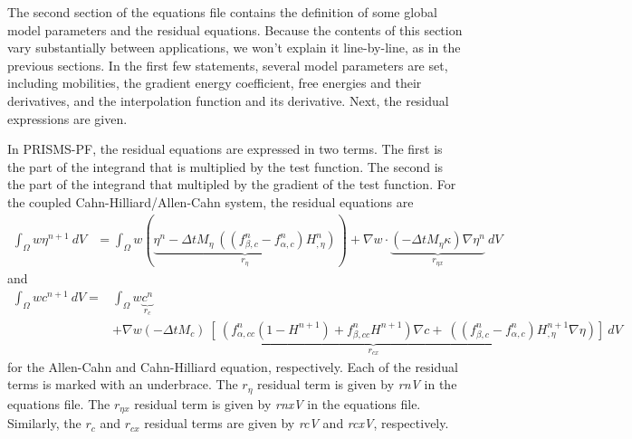 \documentclass[10pt]{article} %
\begin{document}
The second section of the equations file contains the definition of some global model parameters and the residual equations. Because the contents of this section vary substantially between applications, we won't explain it line-by-line, as in the previous sections. In the first few statements, several model parameters are set, including mobilities, the gradient energy coefficient, free energies and their derivatives, and the interpolation function and its derivative. Next, the residual expressions are given. 

In PRISMS-PF, the residual equations are expressed in two terms. The first is the part of the integrand that is multiplied by the test function. The second is the part of the integrand that multipled by the gradient of the test function. For the coupled Cahn-Hilliard/Allen-Cahn system, the residual equations are 
\begin{align}
  \int_{\Omega}   w  \eta^{n+1}  ~dV &=\int_{\Omega}  w  \left( \underbrace{\eta^{n} - \Delta t M_{\eta}~ ((f_{\beta,c}^n-f_{\alpha,c}^n)H_{,\eta}^n)}_{r_{\eta}} \right)+ \nabla w \cdot \underbrace{(- \Delta t M_{\eta}\kappa) \nabla \eta^{n}}_{r_{\eta x}} ~dV 
\end{align}
and 
\begin{align}
  \int_{\Omega}   w  c^{n+1}  ~dV = &\int_{\Omega}   w \underbrace{c^{n}}_{r_c} \\&+  \nabla w   \underbrace{(-\Delta t M_{c})~ [~(f_{\alpha,cc}^n(1-H^{n+1})+f_{\beta,cc}^n H^{n+1}) \nabla c + ~((f_{\beta,c}^n-f_{\alpha,c}^n)H^{n+1}_{,\eta} \nabla \eta) ] }_{r_{cx}} ~dV
\end{align}
for the Allen-Cahn and Cahn-Hilliard equation, respectively. Each of the residual terms is marked with an underbrace. The $r_\eta$ residual term is given by \emph{rnV} in the equations file. The $r_{\eta x}$ residual term is given by \emph{rnxV} in the equations file. Similarly, the $r_c$ and $r_{cx}$ residual terms are given by \emph{rcV} and \emph{rcxV}, respectively.
\end{document}
